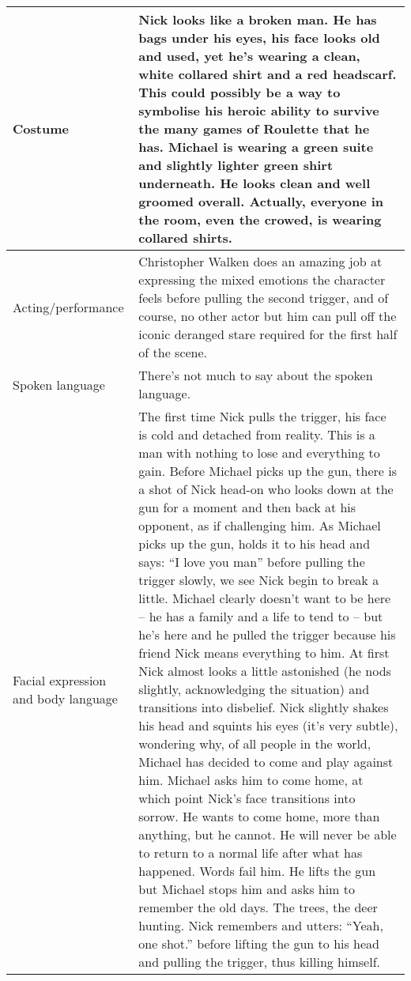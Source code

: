 \documentclass[notitlepage]{fhnwreport}
\begin{document}
\begin{center}
\begin{threeparttable}
    \begin{tabular}{p{4.2cm}p{11cm}}
        \midrule
        Costume &

Nick looks like a broken man. He has bags under  his  eyes, his face looks old
and used, yet he's wearing a  clean, white collared shirt and a red headscarf.
This  could possibly be a way to symbolise his heroic ability to  survive  the
many games of Roulette that he has. Michael  is  wearing  a  green  suite  and
slightly  lighter  green  shirt  underneath.  He  looks clean and well groomed
overall. Actually, everyone in  the room, even the crowed, is wearing collared
shirts. \\

        \midrule
        Acting/performance &

Christopher Walken does an amazing  job  at  expressing the mixed emotions the
character feels before pulling the second trigger,  and  of  course,  no other
actor but him can  pull  off  the iconic deranged stare required for the first
half of the scene. \\

        \midrule
        Spoken language & 

There's not much to say about the spoken language. \\

        \midrule
        Facial expression and body language &

The first time Nick pulls  the  trigger,  his  face  is cold and detached from
reality. This is a man with nothing to lose  and  everything  to  gain. Before
Michael picks up the  gun,  there  is a shot of Nick head-on who looks down at
the gun  for a moment and then back at his opponent, as if challenging him. As
Michael picks up the gun, holds it  to  his  head and says: ``I love you man''
before pulling the  trigger  slowly,  we  see  Nick  begin  to break a little.
Michael clearly doesn't want to be here -- he has a family and a life  to tend
to  --  but he's here and he pulled the trigger because his friend Nick  means
everything to him. At first Nick almost  looks  a  little  astonished (he nods
slightly, acknowledging the situation) and  transitions  into  disbelief. Nick
slightly shakes his head and squints his eyes  (it's  very  subtle), wondering
why, of all people in the world, Michael has decided to  come and play against
him. Michael asks him to come home,  at  which  point  Nick's face transitions
into sorrow. He wants to come home, more than anything, but he cannot. He will
never be able to return to a normal life after what has  happened.  Words fail
him. He lifts the gun but Michael stops him and asks him  to  remember the old
days. The trees, the  deer  hunting.  Nick  remembers  and utters: ``Yeah, one
shot.'' before lifting  the  gun  to  his  head  and pulling the trigger, thus
killing himself. \\

        \bottomrule
    \end{tabular}
\end{threeparttable}
\end{center}
\end{document}
